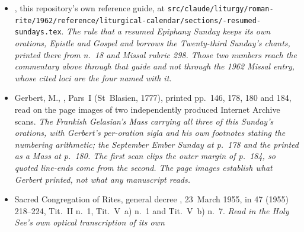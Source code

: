 \begin{itemize}[leftmargin=1.2em, itemsep=0.15em]
{Friday after Lent~II, the Communion at the Thursday after Lent~IV, and Ps.~97:1
as the Introit antiphon of the Fourth Sunday after Easter and as the psalm verse
standing at the Introits of Easter Thursday, of the Assumption, of the Maternity
of the Blessed Virgin Mary and of the Octave of the Nativity. At the Epistle: the other two
appointments of Ephesians~3, at the Sacred Heart and at St~Margaret Mary
Alacoque, and the doxology Eph.~3:20--21 standing in it at this Mass and at no
other.\ifdefined\TriptychSynthesisEdition\else{} At the Gospel: Luke~14 in three
separated blocks, with vv.~12--15 and v.~25 appointed nowhere in it.\fi{} It
holds no votive Masses at all, so the
Communion's votive appointment above rests on the 1962 book's own text layer and
not on it. No page image controls any of them.}
\ifdefined\TriptychSynthesisEdition\else
\item {\raggedright {}, this
repository's own reference guide, at
\texttt{src/claude/liturgy/roman-rite/1962/\allowbreak reference/\allowbreak liturgical-calendar/\allowbreak sections/-resumed-sundays.tex}.
\textit{The rule that a resumed Epiphany Sunday keeps its own orations, Epistle
and Gospel and borrows the Twenty-third Sunday's chants, printed there from
 n.~18 and Missal rubric 298. Those two numbers reach
the commentary above through that guide and not through the 1962 Missal entry,
whose cited  loci are the four named with it.}\par}
\fi
\item Gerbert, M., , Pars~I
(St~Blasien, 1777), printed pp.~146, 178, 180 and 184, read on the page images
of two independently produced Internet Archive scans. \textit{The Frankish
Gelasian's Mass carrying all three of this Sunday's orations, with Gerbert's
per-oration sigla and his own footnotes stating the numbering arithmetic; the
September Ember Sunday at p.~178 and the  printed as a Mass
at p.~180. The first scan clips the outer margin of p.~184, so quoted line-ends
come from the second. The page images establish what Gerbert printed, not what
any manuscript reads.}
\item Sacred Congregation of Rites, general decree , 23~March 1955, in 
47 (1955) 218--224, Tit.~II n.~1, Tit.~V~a) n.~1 and Tit.~V~b) n.~7.
\textit{Read in the Holy See's own optical transcription of its own 
}
\end{itemize}
